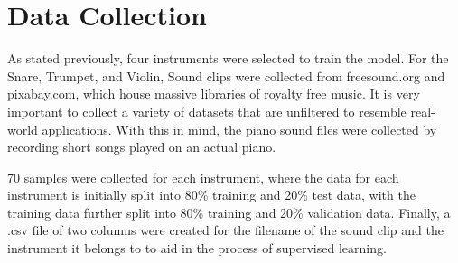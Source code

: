 % 
% 
% 
\section{Data Collection \label{ch: data_collection}}
\vspace{0.5cm}

As stated previously, four instruments were selected to train the model. For the Snare, Trumpet, and Violin, Sound clips were collected from freesound.org and pixabay.com, which house massive libraries of royalty free music. It is very important to collect a variety of datasets that are unfiltered to resemble real-world applications. With this in mind, the piano sound files were collected by recording short songs played on an actual piano. 

70 samples were collected for each instrument, where the data for each instrument is initially split into 80\% training and 20\% test data, with the training data further split into 80\% training and 20\% validation data. Finally, a .csv file of two columns were created for the filename of the sound clip and the instrument it belongs to to aid in the process of supervised learning. 


% 
% 
